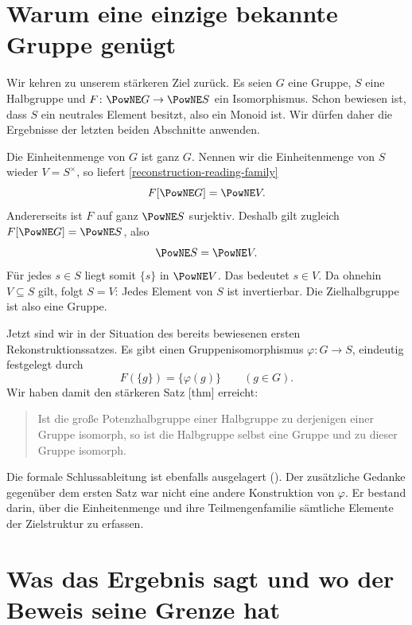 \par{}
\section*{Warum eine einzige bekannte Gruppe genügt}
\hypertarget{reconstruction.reading.rigidity}{}

Wir kehren zu unserem stärkeren Ziel zurück. Es seien \(G\)
eine Gruppe, \(S\) eine Halbgruppe und
\(F\colon\PowNE G\to\PowNE S\) ein Isomorphismus.
Schon bewiesen ist, dass \(S\) ein neutrales Element besitzt,
also ein Monoid ist. Wir dürfen daher die Ergebnisse der
letzten beiden Abschnitte anwenden.

Die Einheitenmenge von \(G\) ist ganz \(G\). Nennen wir die
Einheitenmenge von \(S\) wieder \(V=S^\times\), so liefert
\eqref{reconstruction-reading-family}
\[
  F[\PowNE G]=\PowNE V.
\]
Andererseits ist \(F\) auf ganz \(\PowNE S\) surjektiv.
Deshalb gilt zugleich \(F[\PowNE G]=\PowNE S\), also
\[
  \PowNE S=\PowNE V.
\]
Für jedes \(s\in S\) liegt somit \(\{s\}\) in \(\PowNE V\).
Das bedeutet \(s\in V\). Da ohnehin \(V\subseteq S\) gilt,
folgt \(S=V\): Jedes Element von \(S\) ist invertierbar.
Die Zielhalbgruppe ist also eine Gruppe.

Jetzt sind wir in der Situation des bereits bewiesenen ersten
Rekonstruktionssatzes. Es gibt einen Gruppenisomorphismus
\(\varphi\colon G\to S\), eindeutig festgelegt durch
\[
  F(\{g\})=\{\varphi(g)\}\qquad(g\in G).
\]
Wir haben damit den stärkeren Satz
[thm] erreicht:
\begin{quote}
  Ist die große Potenzhalbgruppe einer Halbgruppe zu derjenigen
  einer Gruppe isomorph, so ist die Halbgruppe selbst eine
  Gruppe und zu dieser Gruppe isomorph.
\end{quote}
Die formale Schlussableitung ist ebenfalls ausgelagert
().
Der zusätzliche Gedanke gegenüber dem ersten Satz war nicht
eine andere Konstruktion von \(\varphi\). Er bestand darin,
über die Einheitenmenge und ihre Teilmengenfamilie sämtliche
Elemente der Zielstruktur zu erfassen.

\par{}
\section*{Was das Ergebnis sagt und wo der Beweis seine Grenze hat}
\hypertarget{reconstruction.reading.limits}{}

